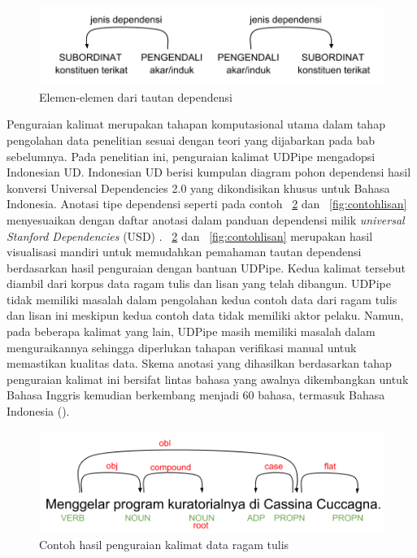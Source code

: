 \begin{figure}
	\centering \includegraphics[width=0.6
	\textwidth] {pics/tautandependensi.png} \caption{Elemen-elemen dari tautan dependensi} 
\label{fig:tautandependensi} \end{figure}

Penguraian kalimat merupakan tahapan komputasional utama dalam tahap pengolahan data penelitian sesuai dengan teori yang dijabarkan pada bab sebelumnya. Pada penelitian ini, penguraian kalimat UDPipe mengadopsi Indonesian UD. Indonesian UD berisi kumpulan diagram pohon dependensi hasil konversi Universal Dependencies 2.0 \citep{nivre2017universal} yang dikondisikan khusus untuk Bahasa Indonesia. Anotasi tipe dependensi seperti pada contoh \pic~\ref{fig:contohtulis} dan \pic~\ref{fig:contohlisan} menyesuaikan dengan daftar anotasi dalam panduan dependensi milik \textit{universal Stanford Dependencies} (USD) \citep{de2014universal}. \pic~\ref{fig:contohtulis} dan \pic~\ref{fig:contohlisan} merupakan hasil visualisasi mandiri untuk memudahkan pemahaman tautan dependensi berdasarkan hasil penguraian dengan bantuan UDPipe. Kedua kalimat tersebut diambil dari korpus data ragam tulis dan lisan yang telah dibangun. UDPipe tidak memiliki masalah dalam pengolahan kedua contoh data dari ragam tulis dan lisan ini meskipun kedua contoh data tidak memiliki aktor pelaku. Namun, pada beberapa kalimat yang lain, UDPipe masih memiliki masalah dalam menguraikannya sehingga diperlukan tahapan verifikasi manual untuk memastikan kualitas data. Skema anotasi yang dihasilkan berdasarkan tahap penguraian kalimat ini bersifat lintas bahasa yang awalnya dikembangkan untuk Bahasa Inggris kemudian berkembang menjadi 60 bahasa, termasuk Bahasa Indonesia (\citealp{de2008stanford, de2014universal, nivre2017universal}). 

\begin{figure}
	\centering \includegraphics[width=0.5
	\textwidth] {pics/contohtulis.png} \caption{Contoh hasil penguraian kalimat data ragam tulis} 
\label{fig:contohtulis} \end{figure}

